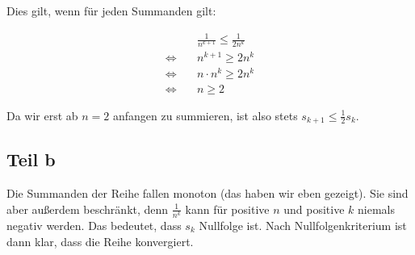 \documentclass[a4paper,german,12pt,smallheadings]{scrartcl}
\begin{document}
Dies gilt, wenn für jeden Summanden gilt:

\begin{align*}
  &\frac{1}{n^{k+1}} \le \frac{1}{2n^k} \\
  \Leftrightarrow\quad& n^{k+1} \ge 2n^k \\
  \Leftrightarrow\quad& n \cdot n^{k} \ge 2n^k \\
  \Leftrightarrow\quad& n \ge 2
\end{align*}

Da wir erst ab $n=2$ anfangen zu summieren, ist also stets $s_{k+1} \le \frac{1}{2}s_k$.

\subsection*{Teil b}
Die Summanden der Reihe fallen monoton (das haben wir eben gezeigt). Sie sind
aber außerdem beschränkt, denn $\frac{1}{n^k}$ kann für positive $n$ und
positive $k$ niemals negativ werden. Das bedeutet, dass $s_k$ Nullfolge ist.
Nach Nullfolgenkriterium ist dann klar, dass die Reihe konvergiert.
\end{document}
